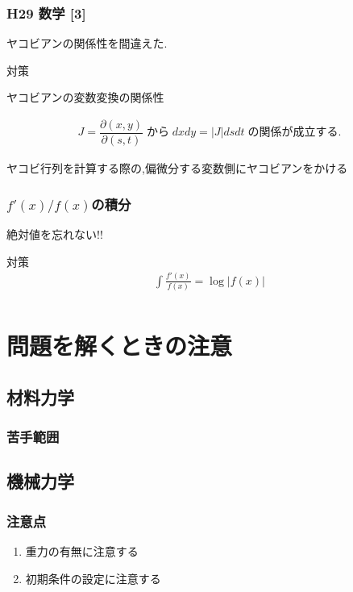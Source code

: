 \documentclass[a4paper]{jsarticle}
\begin{document}
\subsubsection{H29 数学 [3]}
ヤコビアンの関係性を間違えた.
\begin{itembox}[l]{対策}
    \begin{center}
        ヤコビアンの変数変換の関係性
    \end{center}
    \begin{eqnarray*}
        J=\dfrac{\partial \left(x,y\right)}{\partial \left(s,t\right)}\; から\; dxdy=|J|dsdt\; の関係が成立する.
    \end{eqnarray*}
    \begin{center}
        ヤコビ行列を計算する際の,偏微分する変数側にヤコビアンをかける
    \end{center}
\end{itembox}
\subsubsection{$f'\left(x\right)/f\left(x\right)$の積分}
絶対値を忘れない!!
\begin{itembox}[l]{対策}
    \begin{eqnarray*}
        \displaystyle\int\frac{f'\left(x\right)}{f\left(x\right)}=\log \left|f\left(x\right)\right|\\
    \end{eqnarray*}
\end{itembox}
\newpage
\section{問題を解くときの注意}
\subsection{材料力学}
\subsubsection{苦手範囲}
\subsection{機械力学}
\subsubsection{注意点}
\begin{enumerate}[(1)]
    \item 重力の有無に注意する
    \item 初期条件の設定に注意する
\end{enumerate}
\end{document}
